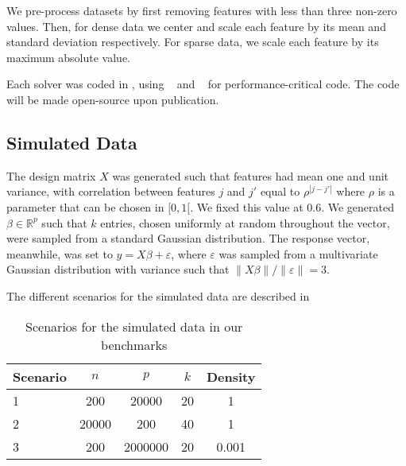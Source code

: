 We pre-process datasets by first removing features with less than three non-zero values. Then, for dense data we center and scale each feature by its mean and standard deviation respectively.
For sparse data, we scale each feature by its maximum absolute value.

Each solver was coded in , using ~\parencite{harris2020} and ~\parencite{lam2015} for performance-critical code.
The code will be made open-source upon publication.



\subsection{Simulated Data}
\label{sec:experiments-real-data}

The design matrix $X$ was generated such that features had mean one and unit variance, with correlation between features $j$ and $j'$ equal to $\rho^{|j-j'|}$ where $\rho$ is a parameter that can be chosen in $[0, 1[$.
We fixed this value at $0.6$.
We generated \(\beta \in \mathbb{R}^p\) such that \(k\) entries, chosen uniformly at random throughout the vector, were sampled from a standard Gaussian distribution.
The response vector, meanwhile, was set to $y=X\beta + \varepsilon$, where
$\varepsilon$ was sampled from a multivariate Gaussian distribution with variance such that $\lVert X\beta\rVert / \lVert \varepsilon \rVert = 3$.

The different scenarios for the simulated data are described in 

\begin{table}[hbt]
  \centering
  \caption{Scenarios for the simulated data in our benchmarks}
  \label{tab:simulated-data}
  \begin{tabular}{
      l
      S[table-format=5.0,round-mode=off]
      S[table-format=7.0,round-mode=off]
      S[table-format=2.0,round-mode=off]
      S[table-format=1.3,round-mode=off]
    }
    \toprule
    {Scenario} & {\(n\)} & {\(p\)} & {\(k\)} & {Density} \\           & 200     & 20000   & 20      & 1         \\
    2          & 20000   & 200     & 40      & 1         \\
    3          & 200     & 2000000 & 20      & 0.001     \\ \bottomrule
  \end{tabular}
\end{table}

